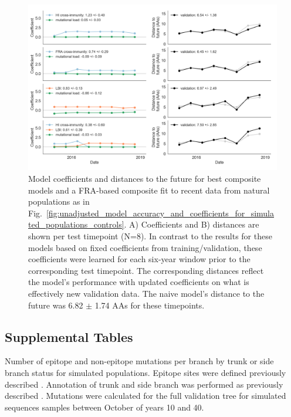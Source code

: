 \begin{figure}[H]
  \begin{center}
  \includegraphics[width=\textwidth]{figures/models-natural-populations-composite-with-updated-coefficients-across-test-data.png}
  \caption{
    Model coefficients and distances to the future for best composite models and a FRA-based composite fit to recent data from natural populations as in Fig.~\ref{fig:unadjusted_model_accuracy_and_coefficients_for_simulated_populations_controls}.
    A) Coefficients and B) distances are shown per test timepoint (N=8).
    In contrast to the results for these models based on fixed coefficients from training/validation, these coefficients were learned for each six-year window prior to the corresponding test timepoint.
    The corresponding distances reflect the model's performance with updated coefficients on what is effectively new validation data.
    The naive model's distance to the future was 6.82 $\pm$ 1.74 AAs for these timepoints.
  }
  \label{sup_fig:updated_model_accuracy_and_coefficients_for_natural_populations_across_test_data}
  \end{center}
\end{figure}

\subsection*{Supplemental Tables}

\begin{table}[H]
  \begin{center}
    
    \caption{
    Number of epitope and non-epitope mutations per branch by trunk or side branch status for simulated populations.
    Epitope sites were defined previously described \cite{Luksza:2014hj}.
    Annotation of trunk and side branch was performed as previously described \cite{Bedford:2015fj}.
    Mutations were calculated for the full validation tree for simulated sequences samples between October of years 10 and 40.
    }
    \label{sup_table:mutations_by_trunk_status_for_simulated_populations}
  \end{center}
\end{table}

